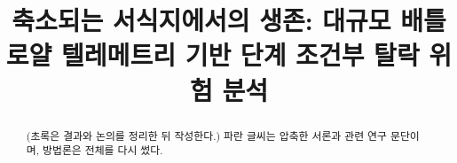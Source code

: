 \documentclass[conference]{IEEEtran}
\newcommand{\rev}[1]{{\color{revblue}#1}}
\begin{document}
\title{축소되는 서식지에서의 생존: 대규모 배틀로얄 텔레메트리 기반 단계 조건부 탈락 위험 분석}
\author{}
\maketitle

\begin{abstract}
(초록은 결과와 논의를 정리한 뒤 작성한다.) \rev{파란 글씨는 압축한 서론과 관련 연구 문단이며, 방법론은 전체를 다시 썼다.}
\end{abstract}







\end{document}
